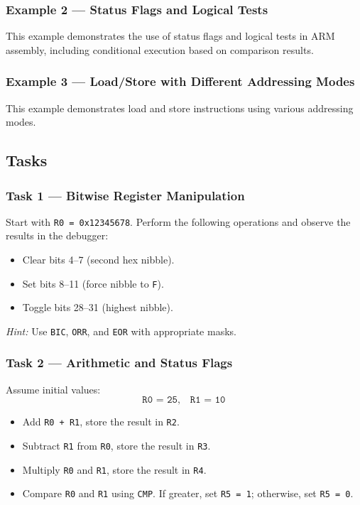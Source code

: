 
\newpage
\subsubsection{Example 2 --- Status Flags and Logical Tests}
This example demonstrates the use of status flags and logical tests in ARM assembly, including conditional execution based on comparison results.


\newpage
\subsubsection{Example 3 --- Load/Store with Different Addressing Modes}
This example demonstrates load and store instructions using various addressing modes.

\subsection{Tasks}

\subsubsection{Task 1 --- Bitwise Register Manipulation}
Start with \texttt{R0 = 0x12345678}. Perform the following operations and observe the results in the debugger:
\begin{itemize}[nosep]
    \item Clear bits 4--7 (second hex nibble).
    \item Set bits 8--11 (force nibble to \texttt{F}).
    \item Toggle bits 28--31 (highest nibble).
\end{itemize}
\emph{Hint:} Use \texttt{BIC}, \texttt{ORR}, and \texttt{EOR} with appropriate masks.

\subsubsection{Task 2 --- Arithmetic and Status Flags}
Assume initial values:
\[
\texttt{R0 = 25}, \quad \texttt{R1 = 10}
\]

\begin{itemize}[nosep]
    \item Add \texttt{R0 + R1}, store the result in \texttt{R2}.
    \item Subtract \texttt{R1} from \texttt{R0}, store the result in \texttt{R3}.
    \item Multiply \texttt{R0} and \texttt{R1}, store the result in \texttt{R4}.
    \item Compare \texttt{R0} and \texttt{R1} using \texttt{CMP}.
          If greater, set \texttt{R5 = 1}; otherwise, set \texttt{R5 = 0}.
\end{itemize}
